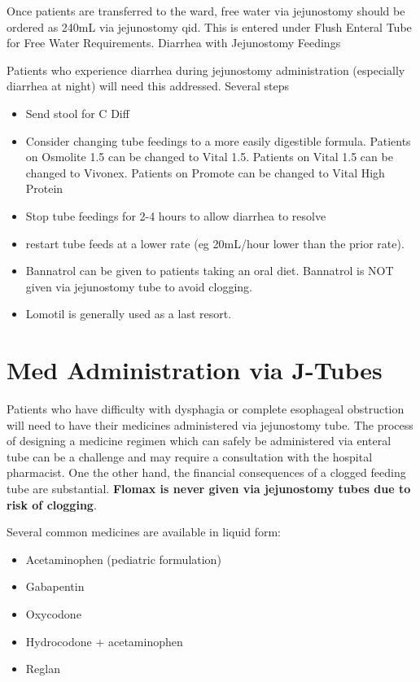 \documentclass[
]{book}
\providecommand{\tightlist}{%
  \setlength{\itemsep}{0pt}\setlength{\parskip}{0pt}}
\begin{document}
Once patients are transferred to the ward, free water via jejunostomy should be ordered as 240mL via jejunostomy qid. This is entered under Flush Enteral Tube for Free Water Requirements.
Diarrhea with Jejunostomy Feedings

Patients who experience diarrhea during jejunostomy administration (especially diarrhea at night) will need this addressed. Several steps

\begin{itemize}
\tightlist
\item
  Send stool for C Diff
\item
  Consider changing tube feedings to a more easily digestible formula. Patients on Osmolite 1.5 can be changed to Vital 1.5. Patients on Vital 1.5 can be changed to Vivonex. Patients on Promote can be changed to Vital High Protein
\item
  Stop tube feedings for 2-4 hours to allow diarrhea to resolve
\item
  restart tube feeds at a lower rate (eg 20mL/hour lower than the prior rate).
\item
  Bannatrol can be given to patients taking an oral diet. Bannatrol is NOT given via jejunostomy tube to avoid clogging.
\item
  Lomotil is generally used as a last resort.
\end{itemize}

\hypertarget{med-administration-via-j-tubes}{%
\section{Med Administration via J-Tubes}\label{med-administration-via-j-tubes}}

Patients who have difficulty with dysphagia or complete esophageal obstruction will need to have their medicines administered via jejunostomy tube. The process of designing a medicine regimen which can safely be administered via enteral tube can be a challenge and may require a consultation with the hospital pharmacist. One the other hand, the financial consequences of a clogged feeding tube are substantial. \textbf{Flomax is never given via jejunostomy tubes due to risk of clogging}.

Several common medicines are available in liquid form:

\begin{itemize}
\tightlist
\item
  Acetaminophen (pediatric formulation)
\item
  Gabapentin
\item
  Oxycodone
\item
  Hydrocodone + acetaminophen
\item
  Reglan
\end{itemize}
\end{document}
